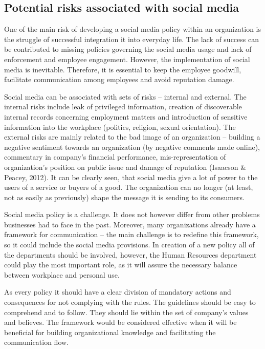 \documentclass[a4paper,fleqn,11pt,dvips,titlepage]{article}
\numberwithin{figure}{section}
\numberwithin{equation}{section}
\begin{document}
\subsection{Potential risks associated with social media}

One of the main risk of developing a social media policy within an organization is the struggle of successful integration it into everyday life.
The lack of success can be contributed to missing policies governing the social media usage and lack of enforcement and employee engagement.
However, the implementation of social media is inevitable.
Therefore, it is essential to keep the employee goodwill, facilitate communication among employees and avoid reputation damage. 

Social media can be associated with sets of risks – internal and external.
The internal risks include leak of privileged information,
creation of discoverable internal records concerning employment matters and introduction of sensitive information into the workplace
(politics, religion, sexual orientation).
The external risks are mainly related to the bad image of an organization
– building a negative sentiment towards an organization (by negative comments made online),
commentary in company’s financial performance, mis-representation of organization’s position on public issue and damage of reputation (Isaacson \& Peacey, 2012).
It can be clearly seen, that social media give a lot of power to the users of a service or buyers of a good.
The organization can no longer (at least, not as easily as previously) shape the message it is sending to its consumers. 

Social media policy is a challenge.
It does not however differ from other problems businesses had to face in the past.
Moreover, many organizations already have a framework for communication – the main challenge is to redefine this framework,
so it could include the social media provisions.
In creation of a new policy all of the departments should be involved, however,
the Human Resources department could play the most important role, as it will assure the necessary balance between workplace and personal use. 

As every policy it should have a clear division of mandatory actions and consequences for not complying with the rules.
The guidelines should be easy to comprehend and to follow.
They should lie within the set of company’s values and believes.
The framework would be considered effective when it will be beneficial for building organizational knowledge and facilitating the communication flow. 
\end{document}
